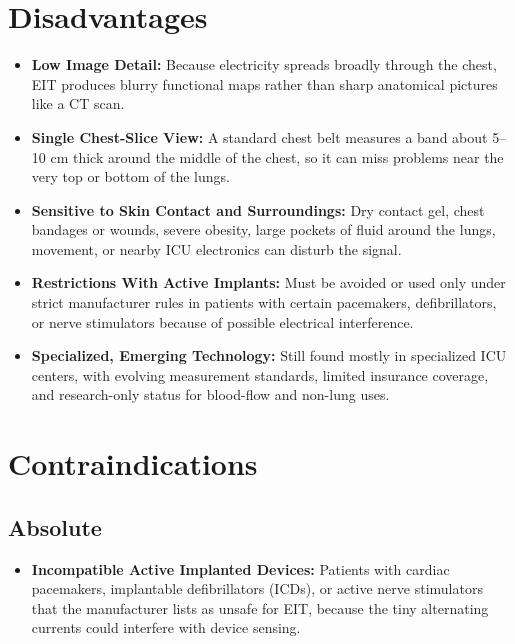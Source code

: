 \section{Disadvantages}
\begin{itemize}
    \item \textbf{Low Image Detail:} Because electricity spreads broadly through the chest, EIT produces blurry functional maps rather than sharp anatomical pictures like a CT scan.
    \item \textbf{Single Chest-Slice View:} A standard chest belt measures a band about 5--10 cm thick around the middle of the chest, so it can miss problems near the very top or bottom of the lungs.
    \item \textbf{Sensitive to Skin Contact and Surroundings:} Dry contact gel, chest bandages or wounds, severe obesity, large pockets of fluid around the lungs, movement, or nearby ICU electronics can disturb the signal.
    \item \textbf{Restrictions With Active Implants:} Must be avoided or used only under strict manufacturer rules in patients with certain pacemakers, defibrillators, or nerve stimulators because of possible electrical interference.
    \item \textbf{Specialized, Emerging Technology:} Still found mostly in specialized ICU centers, with evolving measurement standards, limited insurance coverage, and research-only status for blood-flow and non-lung uses.
\end{itemize}

\section{Contraindications}

\subsection{Absolute}
\begin{itemize}
    \item \textbf{Incompatible Active Implanted Devices:} Patients with cardiac pacemakers, implantable defibrillators (ICDs), or active nerve stimulators that the manufacturer lists as unsafe for EIT, because the tiny alternating currents could interfere with device sensing.
\end{itemize}

